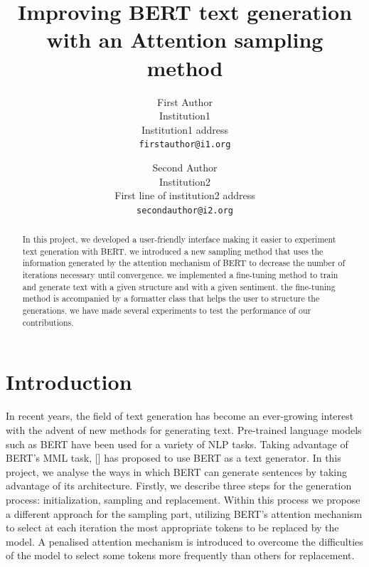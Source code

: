 \documentclass[10pt,twocolumn,letterpaper]{article}
\begin{document}
\title{Improving BERT text generation with an Attention sampling method}

\author{First Author\\
Institution1\\
Institution1 address\\
{\tt\small firstauthor@i1.org}
\and
Second Author\\
Institution2\\
First line of institution2 address\\
{\tt\small secondauthor@i2.org}
}

\maketitle

\begin{abstract}
In this project, we developed a user-friendly interface making it easier
to experiment text generation with BERT. we introduced a new sampling method
that uses the information generated by the attention mechanism of BERT to decrease
the number of iterations necessary until convergence. we implemented a fine-tuning
method to train and generate text with a given structure and with a given sentiment.
the fine-tuning method is accompanied by a formatter class that helps the user to
structure the generations. we have made several experiments to test the performance of
our contributions.
\end{abstract}

\section{Introduction}

In recent years, the field of text generation has become an ever-growing interest
with the advent of new methods for generating text. Pre-trained language models
such as BERT have been used for a variety of NLP tasks. Taking advantage of BERT’s
MML task, [] has proposed to use BERT as a text generator. In this project,
we analyse the ways in which BERT can generate sentences by taking advantage of its
architecture. Firstly, we describe three steps for the generation process: initialization,
sampling and replacement. Within this process we propose a different approach for the
sampling part, utilizing BERT’s attention mechanism to select at each iteration the most
appropriate tokens to be replaced by the model. A penalised attention mechanism is
introduced to overcome the difficulties of the model to select some tokens more frequently
than others for replacement.
\end{document}
